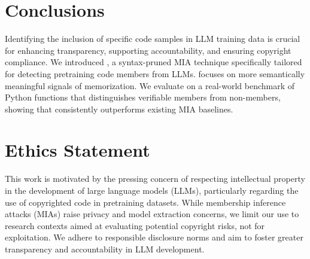 
\section{Conclusions}


Identifying the inclusion of specific code samples in LLM training data is crucial for enhancing transparency, supporting accountability, and ensuring copyright compliance. We introduced \tool, a syntax-pruned MIA technique specifically tailored for detecting pretraining code members from LLMs. %
\tool focuses on more semantically meaningful signals of memorization. 
We evaluate \tool on a real-world benchmark of Python functions that distinguishes verifiable members from non-members, showing that \tool consistently outperforms existing MIA baselines. %


\appendix


\section{Ethics Statement}

This work is motivated by the pressing concern of respecting intellectual property in the development of large language models (LLMs), particularly regarding the use of copyrighted code in pretraining datasets. While membership inference attacks (MIAs) raise privacy and model extraction concerns, we limit our use to research contexts aimed at evaluating potential copyright risks, not for exploitation. We adhere to responsible disclosure norms and aim to foster greater transparency and accountability in LLM development.


